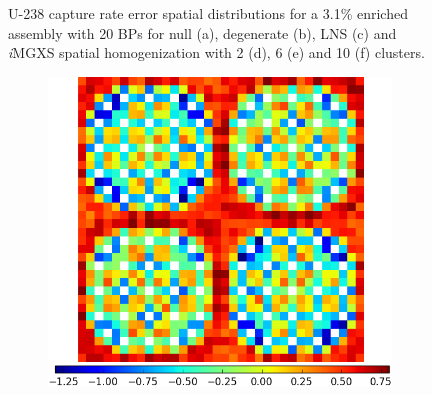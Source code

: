 \begin{figure}[h!]
\begin{subfigure}{0.45\textwidth}
  \caption{}
  \label{fig:chap11-assm-3.1-20BPs-capt-pinch-10}
\end{subfigure}
\vspace{2mm}
\caption[U-238 capture rate errors for a 3.1\% enriched assembly with 20 BPs]{U-238 capture rate error spatial distributions for a 3.1\% enriched assembly with 20 \acp{BP} for null (a), degenerate (b), \ac{LNS} (c) and \textit{i}\ac{MGXS} spatial homogenization with 2 (d), 6 (e) and 10 (f) clusters.}
\label{fig:chap11-assm-3.1-20BPs-capt-rates}
\end{figure}

\clearpage

\begin{figure}[h!]
\centering
\begin{subfigure}{0.45\textwidth}
  \centering
  \includegraphics[width=\linewidth]{figures/results/2x2/ensemble-transform/capt-err-null}
  \caption{}
  \label{fig:chap11-assm-2x2-capt-null}
\end{subfigure}%
\begin{subfigure}{0.45\textwidth}
  \centering

\end{subfigure}
\end{figure}
